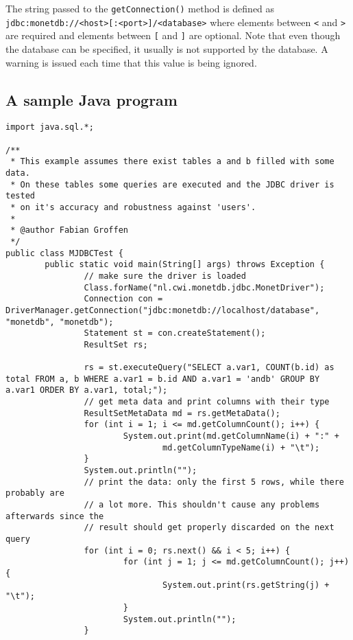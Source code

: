 \documentclass{article}
\begin{document}
The string passed to the \verb"getConnection()" method is defined as
\verb"jdbc:monetdb://<host>[:<port>]/<database>" where elements between
\verb"<" and \verb">" are required and elements between \verb"[" and
\verb"]" are optional.  Note that even though the database can be
specified, it usually is not supported by the database.  A warning is
issued each time that this value is being ignored.

\subsection{A sample Java program}
\begin{verbatim}
import java.sql.*;

/**
 * This example assumes there exist tables a and b filled with some data.
 * On these tables some queries are executed and the JDBC driver is tested
 * on it's accuracy and robustness against 'users'.
 *
 * @author Fabian Groffen
 */
public class MJDBCTest {
        public static void main(String[] args) throws Exception {
                // make sure the driver is loaded
                Class.forName("nl.cwi.monetdb.jdbc.MonetDriver");
                Connection con = DriverManager.getConnection("jdbc:monetdb://localhost/database", "monetdb", "monetdb");
                Statement st = con.createStatement();
                ResultSet rs;

                rs = st.executeQuery("SELECT a.var1, COUNT(b.id) as total FROM a, b WHERE a.var1 = b.id AND a.var1 = 'andb' GROUP BY a.var1 ORDER BY a.var1, total;");
                // get meta data and print columns with their type
                ResultSetMetaData md = rs.getMetaData();
                for (int i = 1; i <= md.getColumnCount(); i++) {
                        System.out.print(md.getColumnName(i) + ":" +
                                md.getColumnTypeName(i) + "\t");
                }
                System.out.println("");
                // print the data: only the first 5 rows, while there probably are
                // a lot more. This shouldn't cause any problems afterwards since the
                // result should get properly discarded on the next query
                for (int i = 0; rs.next() && i < 5; i++) {
                        for (int j = 1; j <= md.getColumnCount(); j++) {
                                System.out.print(rs.getString(j) + "\t");
                        }
                        System.out.println("");
                }


\end{verbatim}
\end{document}
